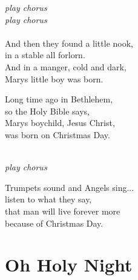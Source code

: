 \documentclass[
  letterpaper,
  a5paper]{memoir}
\begin{document}
\emph{play chorus}\\
\emph{play chorus}\\
\hspace*{0.333em}\hspace*{0.333em}\\
And then they found a little nook,\\
in a stable all forlorn.\\
And in a manger, cold and dark,\\
Mary\textquotesingle s little boy was born.

Long time ago in Bethlehem,\\
so the Holy Bible says,~~\\
Mary\textquotesingle s boychild, Jesus Christ,\\
was born on Christmas Day.

~~\\
\emph{play chorus}

Trumpets sound and Angels sing...\\
listen to what they say,\\
that man will live forever more\\
because of Christmas Day.

\hypertarget{oh-holy-night}{%
\chapter{Oh Holy Night}\label{oh-holy-night}}
\end{document}
